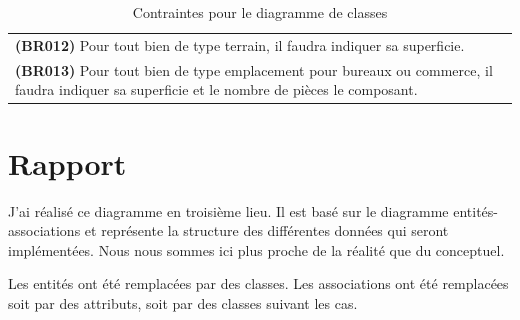 \begin{table}
\begin{tabular}{|p{}|}
  \textbf{(BR012)} Pour tout bien de type \og{}terrain\fg{}, il faudra indiquer sa superficie. \\
  \textbf{(BR013)} Pour tout bien de type \og{}emplacement pour bureaux ou commerce\fg{}, il faudra indiquer sa superficie et le nombre de pièces le composant. \\
  \hline
  \end{tabular}
  \caption{Contraintes pour le diagramme de classes}
  \label{tbl_business_rules}
\end{table}


\section{Rapport}

J'ai réalisé ce diagramme en troisième lieu. Il est basé sur le diagramme entités-associations et représente la structure des différentes données qui seront implémentées. Nous nous sommes ici plus proche de la réalité que du conceptuel.

Les entités ont été remplacées par des classes. Les associations ont été remplacées soit par des attributs, soit par des classes suivant les cas.